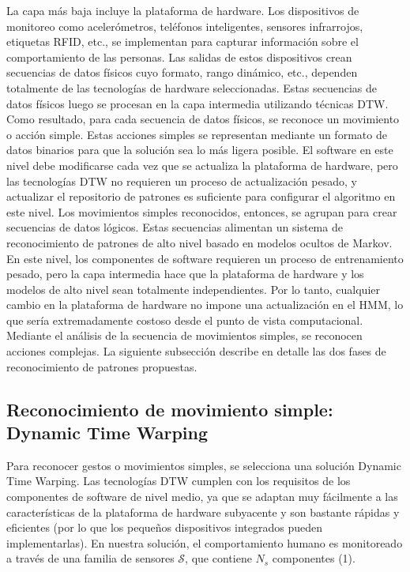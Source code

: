\documentclass[10pt]{article}
\begin{document}
La capa más baja incluye la plataforma de hardware. Los dispositivos de monitoreo como acelerómetros, teléfonos inteligentes, sensores infrarrojos, etiquetas RFID, etc., se implementan para capturar información sobre el comportamiento de las personas. Las salidas de estos dispositivos crean secuencias de datos físicos cuyo formato, rango dinámico, etc., dependen totalmente de las tecnologías de hardware seleccionadas. Estas secuencias de datos físicos luego se procesan en la capa intermedia utilizando técnicas DTW. Como resultado, para cada secuencia de datos físicos, se reconoce un movimiento o acción simple. Estas acciones simples se representan mediante un formato de datos binarios para que la solución sea lo más ligera posible. El software en este nivel debe modificarse cada vez que se actualiza la plataforma de hardware, pero las tecnologías DTW no requieren un proceso de actualización pesado, y actualizar el repositorio de patrones es suficiente para configurar el algoritmo en este nivel. Los movimientos simples reconocidos, entonces, se agrupan para crear secuencias de datos lógicos. Estas secuencias alimentan un sistema de reconocimiento de patrones de alto nivel basado en modelos ocultos de Markov. En este nivel, los componentes de software requieren un proceso de entrenamiento pesado, pero la capa intermedia hace que la plataforma de hardware y los modelos de alto nivel sean totalmente independientes. Por lo tanto, cualquier cambio en la plataforma de hardware no impone una actualización en el HMM, lo que sería extremadamente costoso desde el punto de vista computacional. Mediante el análisis de la secuencia de movimientos simples, se reconocen acciones complejas. La siguiente subsección describe en detalle las dos fases de reconocimiento de patrones propuestas.

\subsection{Reconocimiento de movimiento simple: Dynamic Time Warping}
Para reconocer gestos o movimientos simples, se selecciona una solución Dynamic Time Warping. Las tecnologías DTW cumplen con los requisitos de los componentes de software de nivel medio, ya que se adaptan muy fácilmente a las características de la plataforma de hardware subyacente y son bastante rápidas y eficientes (por lo que los pequeños dispositivos integrados pueden implementarlas). En nuestra solución, el comportamiento humano es monitoreado a través de una familia de sensores $\mathcal{S}$, que contiene $N_{s}$ componentes (1). 
\end{document}
